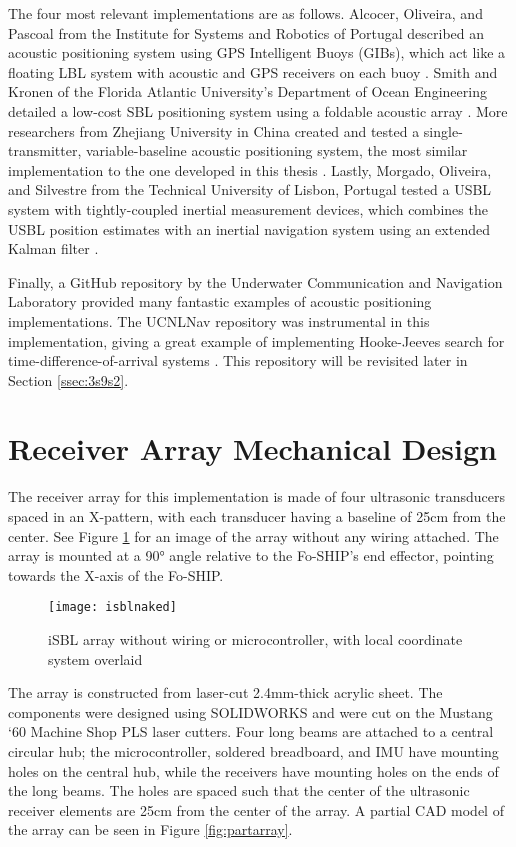 \documentclass[12pt,a4paper]{report}
\begin{document}
The four most relevant implementations are as follows. Alcocer, Oliveira, and Pascoal from the Institute for Systems and Robotics of Portugal described an acoustic positioning system using GPS Intelligent Buoys (GIBs), which act like a floating LBL system with acoustic and GPS receivers on each buoy \cite{gibs}. Smith and Kronen of the Florida Atlantic University’s Department of Ocean Engineering detailed a low-cost SBL positioning system using a foldable acoustic array \cite{lowcostsbl}. More researchers from Zhejiang University in China created and tested a single-transmitter, variable-baseline acoustic positioning system, the most similar implementation to the one developed in this thesis \cite{singletrans}. Lastly, Morgado, Oliveira, and Silvestre from the Technical University of Lisbon, Portugal tested a USBL system with tightly-coupled inertial measurement devices, which combines the USBL position estimates with an inertial navigation system using an extended Kalman filter \cite{tightekf}.

Finally, a GitHub repository by the Underwater Communication and Navigation Laboratory provided many fantastic examples of acoustic positioning implementations. The UCNLNav repository was instrumental in this implementation, giving a great example of implementing Hooke-Jeeves search for time-difference-of-arrival systems \cite{ucnlnav}. This repository will be revisited later in Section \ref{ssec:3s9s2}.

\section{Receiver Array Mechanical Design} \label{sec:3s2}
The receiver array for this implementation is made of four ultrasonic transducers spaced in an X-pattern, with each transducer having a baseline of 25cm from the center. See Figure \ref{fig:isblnaked} for an image of the array without any wiring attached. The array is mounted at a 90° angle relative to the Fo-SHIP’s end effector, pointing towards the X-axis of the Fo-SHIP.

\begin{figure}[htbp]
	\centering
	\texttt{[image: isblnaked]}
	\caption{iSBL array without wiring or microcontroller, with local coordinate system overlaid}
	\label{fig:isblnaked}
\end{figure}

The array is constructed from laser-cut 2.4mm-thick acrylic sheet. The components were designed using SOLIDWORKS and were cut on the Mustang ‘60 Machine Shop PLS laser cutters. Four long beams are attached to a central circular hub; the microcontroller, soldered breadboard, and IMU have mounting holes on the central hub, while the receivers have mounting holes on the ends of the long beams. The holes are spaced such that the center of the ultrasonic receiver elements are 25cm from the center of the array. A partial CAD model of the array can be seen in Figure \ref{fig:partarray}.
\end{document}
